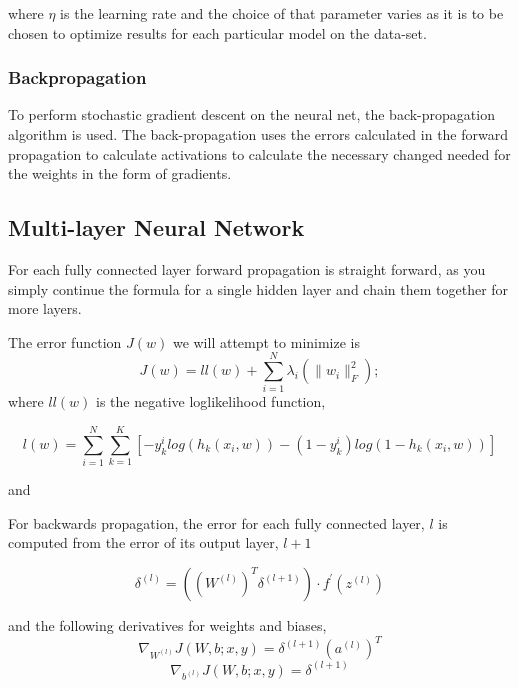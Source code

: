 \documentclass[12pt, twocolumn]{article}
\begin{document}
where $\eta$ is  the learning rate and the choice of that parameter varies as it is to be chosen to optimize results for each particular model on the data-set.


\subsubsection{Backpropagation}

To perform stochastic gradient descent on the neural net, the back-propagation algorithm is used. The back-propagation uses the errors calculated in the forward propagation to calculate activations to calculate the necessary changed needed for the weights in the form of gradients. 


\subsection{Multi-layer Neural Network}


For each fully connected layer forward propagation is straight forward, as you simply continue the formula for a single hidden layer and chain them together for more layers. 

The error function $J(w)$ we will attempt to minimize is 
\begin{equation}
J(w)= ll(w) + \sum_{i=1}^N\lambda_{i}(\|w_i\|_F^2);
\end{equation}
where $ll(w)$ is the negative loglikelihood function,

\begin{equation}
l(w)=\sum_{i=1}^N \sum_{k=1}^K [-y^i_k log(h_k(x_i,w))-(1-y^i_k)log(1-h_k(x_i,w))]
\end{equation}

and 

For backwards propagation, the error for each fully connected layer, $l$ is computed from the error of its output layer, $l+1$  

\begin{equation}
\delta^{(l)}=((W^{(l)})^T \delta^{(l+1)}) \cdot f ^{\prime} (z^{(l)})
\end{equation}

and the following derivatives for weights and biases, 
\begin{equation}
\nabla_{W^{(l)}}J(W,b;x,y) = \delta^{(l+1)}(a^{(l)})^T
\end{equation}
\begin{equation}
\nabla_{b^{(l)}}J(W,b;x,y)= \delta^{(l+1)}
\end{equation}
\end{document}
